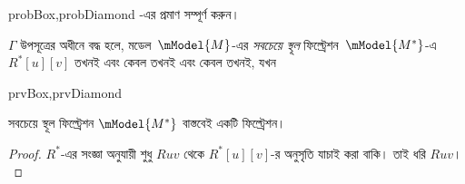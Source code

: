 \documentclass[../../../include/open-logic-section]{subfiles}
\begin{document}
\begin{probtag}{probBox,probDiamond}
  -এর প্রমাণ সম্পূর্ণ করুন।
\end{probtag}

\begin{defn}
  $\Gamma$ উপসূত্রের অধীনে বদ্ধ হলে, মডেল~$\mModel{M}$-এর \emph{সবচেয়ে স্থূল} ফিল্ট্রেশন~$\mModel{M^*}$-এ $R^*[u][v]$ তখনই এবং কেবল তখনই এবং কেবল তখনই, যখন 
  \begin{tagenumerate}{prvBox,prvDiamond}
  \end{tagenumerate}
\end{defn}

\begin{prop}
  সবচেয়ে স্থূল ফিল্ট্রেশন $\mModel{M^*}$ বাস্তবেই একটি ফিল্ট্রেশন।
\end{prop}

\begin{proof}
  $R^*$-এর সংজ্ঞা অনুযায়ী শুধু $Ruv$ থেকে $R^*[u][v]$-র অনুসৃতি যাচাই করা বাকি। তাই ধরি $Ruv$। 
\end{proof}
\end{document}

